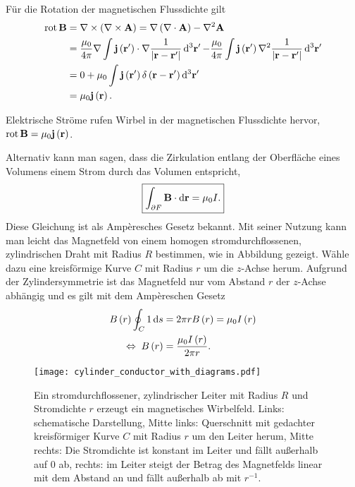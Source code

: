 Für die Rotation der magnetischen Flussdichte gilt
\begin{align}
	\begin{split}
		\label{eq:durchflutungsgesetz_magnetostatik}
		\rot \vec {B}&=\nabla \times \left(\nabla \times \vec {A}\right)=\nabla \left(\nabla \cdot \vec {A}\right)-\nabla ^{2}\vec {A}\\
		&=\frac{\mu _{0}}{4\pi }\nabla \int \vec {j}\left(\vec {r}'\right)\cdot \nabla \frac{1}{\left| \vec {r}-\vec {r}'\right| }\diffa[3]{\vec{r}'}-\frac{\mu _{0}}{4\pi }\int \vec {j}\left(\vec {r}'\right)\nabla ^{2}\frac{1}{\left| \vec {r}-\vec {r}'\right| }\diffa[3]{\vec{r}'}\\
		&=0+\mu _{0}\int \vec {j}\left(\vec {r}'\right)\delta \left(\vec {r}-\vec {r}'\right)\diffa[3]{\vec{r}'}\\&=\mu _{0}\vec {j}\left(\vec {r}\right).
	\end{split}
\end{align}

\begin{formal}
	Elektrische Ströme rufen Wirbel in der magnetischen Flussdichte hervor, $\operatorname{rot} \mathbf{B}=\mu _{0}\mathbf{j}\left(\mathbf{r}\right)$.
\end{formal}
Alternativ kann man sagen, dass die Zirkulation entlang der Oberfläche eines Volumens einem Strom durch das Volumen entspricht,
\begin{equation*}
	\boxed{\int _{\partial F}\mathbf{B}\cdot \mathop{}\!\mathrm{d} \mathbf{r}=\mu _{0}I.}
\end{equation*}
Diese Gleichung ist als Ampèresches Gesetz bekannt. Mit seiner Nutzung kann man leicht das Magnetfeld von einem homogen stromdurchflossenen, zylindrischen Draht mit Radius $R$ bestimmen, wie in Abbildung  gezeigt. Wähle dazu eine kreisförmige Kurve $C$ mit Radius $r$ um die $z$-Achse herum. Aufgrund der Zylindersymmetrie ist das Magnetfeld nur vom Abstand $r$ der $z$-Achse abhängig und es gilt mit dem Ampèreschen Gesetz
\begin{align*}
	B\left(r\right)\oint _{C}1\mathop{}\!\mathrm{d} s & =2\pi rB\left(r\right)=\mu _{0}I\left(r\right) \\
	\;\Leftrightarrow\; B\left(r\right)      & =\frac{\mu _{0}I\left(r\right)}{2\pi r}.
\end{align*}


\begin{figure}[htb]
	\centering
	\texttt{[image: cylinder\_conductor\_with\_diagrams.pdf]}
	\caption{Ein stromdurchflossener, zylindrischer Leiter mit Radius $R$ und Stromdichte $r$ erzeugt ein magnetisches Wirbelfeld. Links: schematische Darstellung, Mitte links: Querschnitt mit gedachter kreisförmiger Kurve $C$ mit Radius $r$ um den Leiter herum, Mitte rechts: Die Stromdichte ist konstant im Leiter und fällt außerhalb auf $0$ ab, rechts: im Leiter steigt der Betrag des Magnetfelds linear mit dem Abstand an und fällt außerhalb ab mit $r^{-1}$.  }
	\label{fig:cylinder_conductor_with_diagrams}
\end{figure}

